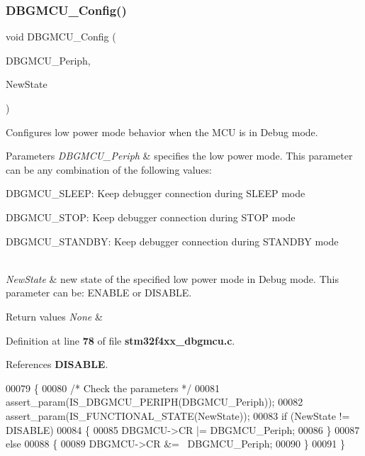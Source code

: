 \subsubsection{D\+B\+G\+M\+C\+U\+\_\+\+Config()}
{\footnotesize\ttfamily void D\+B\+G\+M\+C\+U\+\_\+\+Config (\begin{DoxyParamCaption}\item[{uint32\+\_\+t}]{D\+B\+G\+M\+C\+U\+\_\+\+Periph,  }\item[{\textbf{ Functional\+State}}]{New\+State }\end{DoxyParamCaption})}



Configures low power mode behavior when the M\+CU is in Debug mode. 


\begin{DoxyParams}{Parameters}
{\em D\+B\+G\+M\+C\+U\+\_\+\+Periph} & specifies the low power mode. This parameter can be any combination of the following values\+: \begin{DoxyItemize}
\item D\+B\+G\+M\+C\+U\+\_\+\+S\+L\+E\+EP\+: Keep debugger connection during S\+L\+E\+EP mode \item D\+B\+G\+M\+C\+U\+\_\+\+S\+T\+OP\+: Keep debugger connection during S\+T\+OP mode \item D\+B\+G\+M\+C\+U\+\_\+\+S\+T\+A\+N\+D\+BY\+: Keep debugger connection during S\+T\+A\+N\+D\+BY mode \end{DoxyItemize}
\\
\hline
{\em New\+State} & new state of the specified low power mode in Debug mode. This parameter can be\+: E\+N\+A\+B\+LE or D\+I\+S\+A\+B\+LE. \\
\hline
\end{DoxyParams}

\begin{DoxyRetVals}{Return values}
{\em None} & \\
\hline
\end{DoxyRetVals}


Definition at line \textbf{ 78} of file \textbf{ stm32f4xx\+\_\+dbgmcu.\+c}.



References \textbf{ D\+I\+S\+A\+B\+LE}.


\begin{DoxyCode}
00079 \{
00080   \textcolor{comment}{/* Check the parameters */}
00081   assert_param(IS_DBGMCU_PERIPH(DBGMCU\_Periph));
00082   assert_param(IS_FUNCTIONAL_STATE(NewState));
00083   \textcolor{keywordflow}{if} (NewState != DISABLE)
00084   \{
00085     DBGMCU->CR |= DBGMCU\_Periph;
00086   \}
00087   \textcolor{keywordflow}{else}
00088   \{
00089     DBGMCU->CR &= ~DBGMCU\_Periph;
00090   \}
00091 \}
\end{DoxyCode}
\mbox{\label{group__DBGMCU_gac34193c34dbce759bf424957a31b3266}} 
